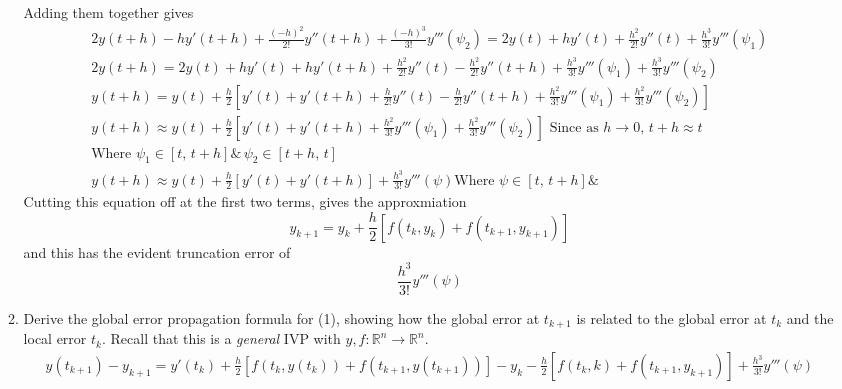 \documentclass{article}
\begin{document}
\begin{enumerate}
\begin{enumerate}
               Adding them together gives 
               \begin{align*}
               2y(t + h) - hy'(t + h) 
               + \frac{(-h)^2}{2!} y''(t+h) 
               + \frac{(-h)^3}{3!}y'''(\psi_2)
               = 2y(t) + hy'(t) + \frac{h^2}{2!} y''(t) 
               + \frac{h^3}{3!}y'''(\psi_1) \\
               2y(t + h) 
               = 2y(t) + hy'(t) + hy'(t + h) + \frac{h^2}{2!} y''(t) 
               - \frac{h^2}{2!} y''(t+h) 
               + \frac{h^3}{3!}y'''(\psi_1) 
               + \frac{h^3}{3!}y'''(\psi_2) \\
               y(t + h) 
               = y(t) + \frac{h}{2}
               [y'(t) + y'(t + h) + \frac{h}{2!} y''(t) 
               - \frac{h}{2!} y''(t+h) 
               + \frac{h^2}{3!}y'''(\psi_1) 
               + \frac{h^2}{3!}y'''(\psi_2)] \\
               y(t + h) \approx y(t) + \frac{h}{2}
               [y'(t) + y'(t + h) 
               + \frac{h^2}{3!}y'''(\psi_1) 
               + \frac{h^2}{3!}y'''(\psi_2)] \text{ Since as }
               h \rightarrow 0,\, t + h \approx t\\
               \text{Where } \psi_1 \in [t,\, t+h] \& \,
               \psi_2 \in [t+h ,\, t] \\
               y(t + h) \approx y(t) + \frac{h}{2}
               [y'(t) + y'(t + h)]
               + \frac{h^3}{3!}y'''(\psi) 
               \text{Where } \psi \in [t,\, t+h] \& \,
               \end{align*}
               Cutting this equation off at the first two terms, gives
               the approxmiation
               \[ y_{k+1}
               = y_k + \frac{h}{2}
               [f(t_k, y_k) + f(t_{k+1}, y_{k+1})] \]
               and this has the evident truncation error of 
               \[\frac{h^3}{3!}y'''(\psi) \]
            \item Derive the global error propagation formula for (1),
                showing how the global error at $t_{k+1}$ is related
                to the global error at $t_k$ and the local error $t_k$.
                Recall that this is a \textit{general} IVP with $y,f:
                \mathbb{R}^n \rightarrow \mathbb{R}^n$.
                \begin{align*} y(t_{k+1}) - y_{k+1} = 
                    y'(t_k) + \frac{h}{2}
                    [f(t_k, y(t_k)) + f(t_{k+1}, y(t_{k+1})) ]
                    - y_k - \frac{h}{2}[f(t_k, k)
                    + f(t_{k+1}, y_{k+1})] + \frac{h^3}{3!}y'''(\psi) \\

\end{align*}
\end{enumerate}
\end{enumerate}
\end{document}
